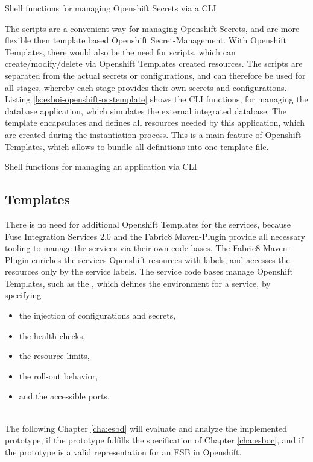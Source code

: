 \begin{listing}[h]
	\caption{Shell functions for managing Openshift Secrets via a CLI}
	\label{ls:esboi-openshift-oc-service}
\end{listing}

The scripts are a convenient way for managing Openshift Secrets, and are more flexible then template based Openshift Secret-Management. With Openshift Templates, there would also be the need for scripts, which can create/modify/delete via Openshift Templates created resources. The scripts are separated from the actual secrets or configurations, and can therefore be used for all stages, whereby each stage provides their own secrets and configurations. \\

Listing \vref{ls:esboi-openshift-oc-template} shows the CLI functions, for managing the database application, which simulates the external integrated database. The template encapsulates and defines all resources needed by this application, which are created during the instantiation process. This is a main feature of Openshift Templates, which allows to bundle all definitions into one template file.
 
\begin{listing}[h]
	\caption{Shell functions for managing an application via CLI}
	\label{ls:esboi-openshift-oc-template}
\end{listing}

\subsection{Templates}
\label{sec:esbi-openshift-config}
There is no need for additional Openshift Templates for the services, because Fuse Integration Services 2.0 and the Fabric8 Maven-Plugin provide all necessary tooling to manage the services via their own code bases. The Fabric8 Maven-Plugin enriches the services Openshift resources with labels, and accesses the resources only by the service labels. The service code bases manage Openshift Templates, such as the , which defines the environment for a service, by specifying
\begin{itemize}
	\item the injection of configurations and secrets,
	\item the health checks,
	\item the resource limits,
	\item the roll-out behavior,
	\item and the accessible ports.
\end{itemize}
\ \\
The following Chapter \vref{cha:esbd} will evaluate and analyze the implemented prototype, if the prototype fulfills the specification of Chapter \vref{cha:esboc}, and if the prototype is a valid representation for an ESB in Openshift.


